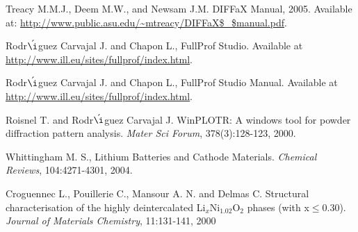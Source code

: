 \begin{thebibliography}{99}
 Treacy M.M.J., Deem M.W., and Newsam J.M. DIFFaX Manual, 2005. Available at: \url{http://www.public.asu.edu/~mtreacy/DIFFaX$\_$manual.pdf}. 

 Rodr$\acute{\i}$guez Carvajal J. and Chapon L., FullProf Studio. Available at \url{http://www.ill.eu/sites/fullprof/index.html}.

 Rodr$\acute{\i}$guez Carvajal J. and Chapon L., FullProf Studio Manual. Available at \url{http://www.ill.eu/sites/fullprof/index.html}.

 Roisnel T. and Rodr$\acute{\i}$guez Carvajal J. WinPLOTR: A windows tool for powder diffraction pattern analysis. \textit{Mater Sci Forum}, 378(3):128-123, 2000.

 Whittingham M. S., Lithium Batteries and Cathode Materials. \textit{Chemical Reviews}, 104:4271-4301, 2004. 

 Croguennec L., Pouillerie C., Mansour A. N. and Delmas C. Structural characterisation of the highly deintercalated Li$_{x}$Ni$_{1.02}$O$_{2}$ phases (with x$\leq$0.30). \textit{Journal of Materials Chemistry}, 11:131-141, 2000


\end{thebibliography}
